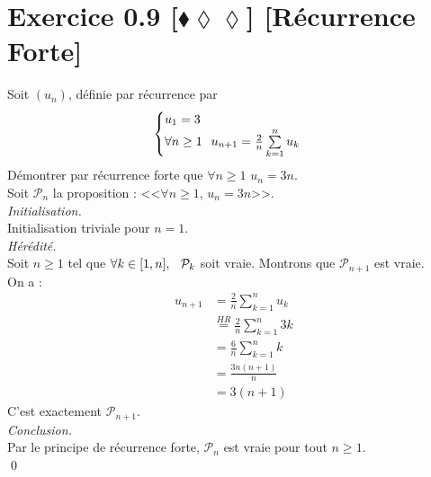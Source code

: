 \documentclass[10pt]{article}
\begin{document}
\section*{Exercice 0.9 [$\blacklozenge\lozenge\lozenge$] [Récurrence Forte]}
\begin{tcolorbox}[enhanced, width=6in, center, size=fbox, fontupper=\large, drop shadow southwest]
    Soit $(u_n)$, définie par récurrence par
    \begin{equation*}
        \begin{cases}
            u_1 = 3\\
            \forall{n\geq1} \hspace{0.25cm} u_{n+1}= \frac{2}{n}\sum\limits^{n}_{k=1}{u_k}
        \end{cases}
    \end{equation*}
    Démontrer par récurrence forte que $\forall{n\geq1}$ $u_n=3n$.\\
    Soit $\mathcal{P}_n$ la proposition : <<$\forall{n\geq1}$, $u_n=3n$>>.\\
    \emph{Initialisation.}\\
    Initialisation triviale pour $n=1$.\\
    \emph{Hérédité.}\\
    Soit $n\geq1$ tel que $\forall k\in[1,n], \hspace{0.25cm} \mathcal{P}_k$ soit vraie. Montrons que $\mathcal{P}_{n+1}$ est vraie.\\
    On a :
    \begin{align*}
        u_{n+1} 
        &= \frac{2}{n}\sum^{n}_{k=1}{u_k}\\
        &\stackrel{HR}{=} \frac{2}{n}\sum^{n}_{k=1}{3k}\\
        &= \frac{6}{n}\sum^{n}_{k=1}{k}\\
        &= \frac{3n(n+1)}{n}\\
        &= 3(n+1)
    \end{align*}
    C'est exactement $\mathcal{P}_{n+1}$.\\
    \emph{Conclusion.}\\
    Par le principe de récurrence forte, $\mathcal{P}_n$ est vraie pour tout $n\geq1$.\\
    \qed
\end{tcolorbox}
\end{document}
